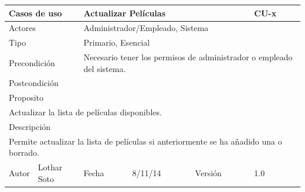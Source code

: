 \documentclass{article}
\begin{document}
\clearpage

\begin{table}[h]
\begin{tabular}{|l|l|l|l|l|l|}
\hline
\multicolumn{2}{|p{2cm}|}{Casos de uso}  & \multicolumn{3}{p{7cm}|}{Actualizar Películas} & CU-x \\
\hline
\multicolumn{2}{|p{2cm}|}{Actores}       & \multicolumn{4}{p{8cm}|}{Administrador/Empleado, Sistema}        \\
\hline
\multicolumn{2}{|p{2cm}|}{Tipo}          & \multicolumn{4}{p{8cm}|}{Primario, Esencial}        \\
\hline
\multicolumn{2}{|p{2cm}|}{Precondición}  & \multicolumn{4}{p{8cm}|}{Necesario tener los permisos de administrador o empleado del sistema.}        \\
\hline
\multicolumn{2}{|p{2cm}|}{Postcondición} & \multicolumn{4}{p{8cm}|}{}        \\
\hline
\multicolumn{6}{|p{10cm}|}{Proposito}                                   \\
\hline
\multicolumn{6}{|p{10cm}|}{Actualizar la lista de películas disponibles.}                                            \\
\hline
\multicolumn{6}{|p{10cm}|}{Descripción}                                 \\
\hline
\multicolumn{6}{|p{10cm}|}{Permite actualizar la lista de películas si anteriormente se ha añadido una o borrado.}                                            \\
\hline
Autor          &       Lothar Soto        & Fecha    &  8/11/14   &   Versión  & 1.0\\    
\hline
\end{tabular}
\end{table}

\clearpage
\end{document}
